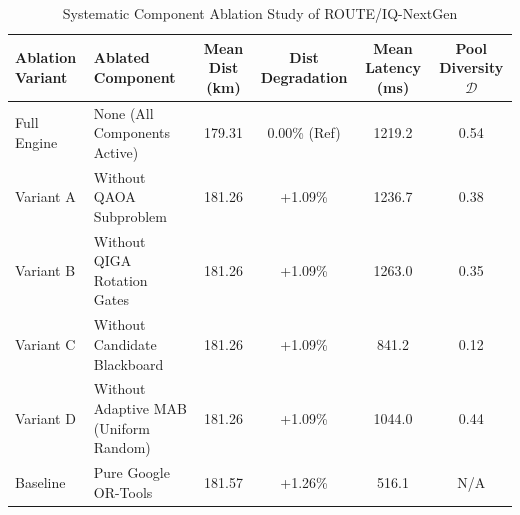 \begin{table}[t]
\centering
\caption{Systematic Component Ablation Study of ROUTE/IQ-NextGen}
\label{tab:ablation_study}
\small
\begin{tabular}{lp{3.5cm}cccc}
\toprule
\textbf{Ablation Variant} & \textbf{Ablated Component} & \textbf{Mean Dist (km)} & \textbf{Dist Degradation} & \textbf{Mean Latency (ms)} & \textbf{Pool Diversity $\mathcal{D}$} \\
\midrule
Full Engine & None (All Components Active) & 179.31 & 0.00\% (Ref) & 1219.2 & 0.54 \\
Variant A & Without QAOA Subproblem & 181.26 & +1.09\% & 1236.7 & 0.38 \\
Variant B & Without QIGA Rotation Gates & 181.26 & +1.09\% & 1263.0 & 0.35 \\
Variant C & Without Candidate Blackboard & 181.26 & +1.09\% & 841.2 & 0.12 \\
Variant D & Without Adaptive MAB (Uniform Random) & 181.26 & +1.09\% & 1044.0 & 0.44 \\
Baseline & Pure Google OR-Tools & 181.57 & +1.26\% & 516.1 & N/A \\
\bottomrule
\end{tabular}
\end{table}
